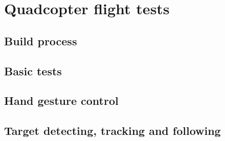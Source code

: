 \section{Quadcopter flight tests}

\subsection{Build process}
\label{sec:test-7-builddrone}



\subsection{Basic tests}
\label{sec:test-8-flight}


\subsection{Hand gesture control}
\label{sec:test-9-hand}


\subsection{Target detecting, tracking and following}
\label{sec:test-10-follow}

            